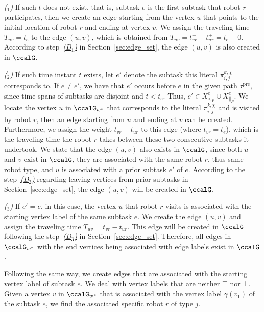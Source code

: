 \documentclass[Afour,sageh,times]{sagej}
\newcounter{mycounter}
\renewcommand{\ap}[3]{\mathcal{\pi}_{{#1},{#2}}^{#3}}
\begin{document}
{{\it ($_1$)} If such $t$ does not exist, that is, subtask $e$ is the first subtask that robot $r$ participates, then we create an edge starting from the vertex $u$ that points to the initial location of robot $r$ and ending at vertex $v$. We assign the traveling time $T_{uv}=t_e$ to the edge $(u,v)$, which is obtained from  $T_{uv} = t_{vr}^- - t_{ur}^+ = t_e - 0$.
According to step~\hyperref[sec:a]{\it (D$_1$)} in Section~\ref{sec:edge_set}, the edge $(u,v)$ is  also  created in $\ccalG$.

{\it ($_2$)} If such time instant $t$ exists, let $e'$ denote the subtask this literal $\ap{i}{j}{k,\chi}$ corresponds to. If $e\neq e'$, we have that $e'$ occurs before $e$ in the given path $\tau^\text{pre}$, since time spans of subtasks are disjoint and $t < t_e$. Thus, $e' \in X_{<_P}^{e} \cup X_{\|_P}^e$. We locate the vertex $u$ in $\ccalG_{w^*}$ that corresponds to the literal $\ap{i}{j}{k,\chi}$ and is visited by robot $r$, then an edge starting from $u$ and ending at $v$ can be created. Furthermore, we assign the weight $t_{vr}^- - t_{ur}^+$ to this edge (where $t_{vr}^-=t_e$), which is the traveling time the robot $r$ takes between these two consecutive subtasks it undertook. We state that the edge $(u, v)$ also exists in $\ccalG$, since both $u$ and $v$ exist in $\ccalG$, they are associated with the same robot $r$, thus  same robot type, and $u$ is associated with a prior subtask $e'$ of $e$. According to the step~\hyperref[sec:b]{\it (D$_2$)} regarding leaving vertices from prior subtasks in Section~\ref{sec:edge_set}, the edge $(u,v)$ will be created in $\ccalG$.

{\it ($_3$)} If $e'=e$, in this case, the vertex $u$ that robot $r$ visits is associated with the starting vertex label of the same subtask  $e$. We create the edge $(u,v)$ and assign the traveling time  $T_{uv} = t_{vr}^- - t_{ur}^+$. This edge will be created in $\ccalG$ following the step~\hyperref[sec:c]{\it (D$_3$)} in Section~\ref{sec:edge_set}. Therefore, all edges in $\ccalG_{w^*}$ with the end vertices being associated with edge labels exist in $\ccalG$.


Following the same way, we create edges that are associated with the starting vertex label of subtask $e$. We deal with vertex labels that are neither $\top$ nor $\bot$. Given a vertex $v$ in $\ccalG_{w^*}$ that is associated with the vertex label $\gamma(v_1)$ of the subtask $e$,  we find  the associated specific  robot $r$ of type $j$.

}
\end{document}
